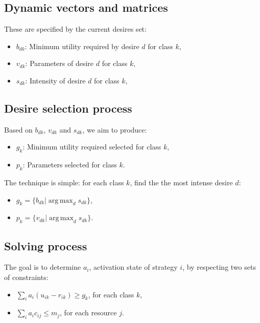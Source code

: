 \documentclass[12pt]{article}
\DeclareMathOperator*{\argmax}{arg\,max}
\begin{document}
\subsection*{Dynamic vectors and matrices} 

These are specified by the current desires set:

\begin{itemize}
	\item $b_{dk}$: Minimum utility required by desire $d$ for class $k$,
	\item $v_{dk}$: Parameters of desire $d$ for class $k$,
	\item $s_{dk}$: Intensity of desire $d$ for class $k$,
\end{itemize}

\subsection*{Desire selection process}

Based on $b_{dk}$, $v_{dk}$ and $s_{dk}$, we aim to produce:

\begin{itemize}
	\item $g_{k}$: Minimum utility required selected for class $k$,
	\item $p_{k}$: Parameters selected for class $k$.
\end{itemize}

The technique is simple: for each class $k$, find the the most intense desire $d$:

\begin{itemize}
	\item $g_{k} = \{ b_{dk} | \argmax_d s_{dk} \} $,
	\item $p_{k} = \{ v_{dk} | \argmax_d s_{dk} \} $. 
\end{itemize}

\subsection*{Solving process}
The goal is to determine $a_{i}$, activation state of strategy $i$, by respecting two sets of constraints:

\begin{itemize}
	\item $\sum\limits_i a_i (u_{ik} - r_{ik}) \geq g_k$, for each class $k$,
	\item $\sum\limits_i a_i c_{ij} \leq m_j$, for each resource $j$.
\end{itemize}
\end{document}
